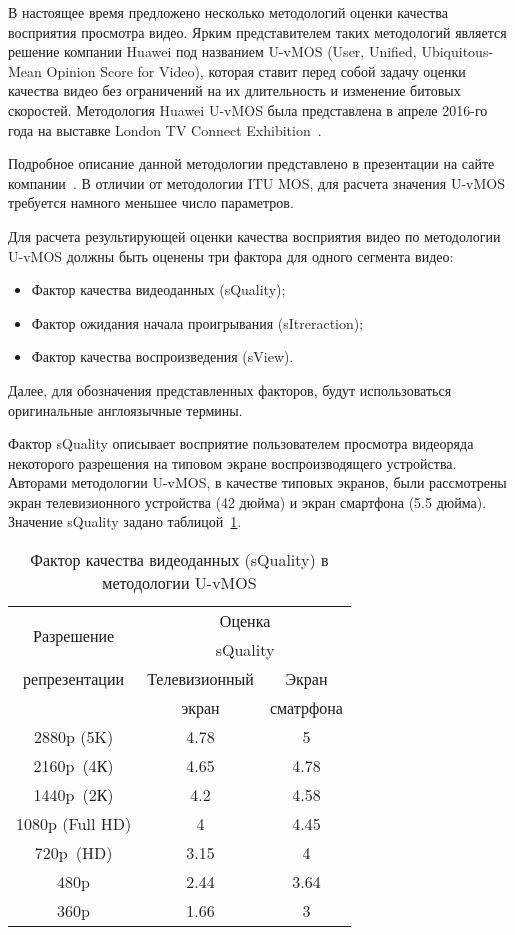В настоящее время предложено несколько методологий оценки качества восприятия просмотра видео. Ярким представителем таких методологий является решение компании Huawei под названием U-vMOS (User, Unified, Ubiquitous-Mean Opinion Score for Video), которая ставит перед собой задачу оценки качества видео без ограничений на их длительность и изменение битовых скоростей. Методология Huawei U-vMOS была представлена в апреле 2016-го года на выставке London TV Connect Exhibition~\cite{UvMOSWhitePaper}.

Подробное описание данной методологии представлено в презентации на сайте компании~\cite{UvMOSPresentation}. В отличии от методологии ITU MOS, для расчета значения U-vMOS требуется намного меньшее число параметров.

Для расчета результирующей оценки качества восприятия видео по методологии U-vMOS должны быть оценены три фактора для одного сегмента видео:
\begin{itemize}
  \item Фактор качества видеоданных (sQuality);
  \item Фактор ожидания начала проигрывания (sItreraction);
  \item Фактор качества воспроизведения (sView).
\end{itemize}
Далее, для обозначения представленных факторов, будут использоваться оригинальные англоязычные термины.

Фактор sQuality описывает восприятие пользователем просмотра видеоряда некоторого разрешения на типовом экране воспроизводящего устройства. Авторами методологии U-vMOS, в качестве типовых экранов, были рассмотрены экран телевизионного устройства (42 дюйма) и экран смартфона (5.5 дюйма). Значение sQuality задано таблицой~\ref{tab:sQuality}.

\begin{table}[!h]
    \caption{Фактор качества видеоданных (sQuality) в методологии U-vMOS}
    \begin{center}
		\label{tab:sQuality}
	    \begin{tabular}{|c|c|c|}
		\hline
		\multirow{2}{*}{Разрешение} & \multicolumn{2}{c|}{Оценка} \\
		 & \multicolumn{2}{c|}{sQuality} \\
		\cline{2-3}
		репрезентации & Телевизионный & Экран\\
		 & экран & сматрфона\\
		\hline
		2880p (5K) & 4.78 & 5 \\
		\hline
		2160p (4К) & 4.65 & 4.78 \\
		\hline
		1440p (2К) & 4.2 & 4.58 \\
		\hline
		1080p (Full HD) & 4 & 4.45 \\
		\hline
		720p (HD) & 3.15 & 4 \\
		\hline
		480p & 2.44 & 3.64 \\
		\hline
		360p & 1.66 & 3 \\
		\hline
		\end{tabular}
	\end{center}
\end{table}

